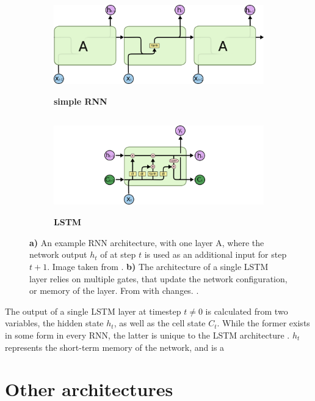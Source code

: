 \begin{figure}
	\centering
	\begin{subfigure}[h]{0.45\linewidth}
	\includegraphics[height=4.2cm]{imgs/simple_RNN.png}
	\caption{\textbf{simple RNN}\label{fig:simple-RNN}}
	\end{subfigure}
	\hfill
	\begin{subfigure}[h]{0.45\linewidth}
	\includegraphics[height=4.2cm]{imgs/LSTM.png}
	\caption{\textbf{LSTM}\label{fig:LSTM}}
	\end{subfigure}
	\caption*{\textbf{a)} An example RNN architecture, with one layer A, where the network output $h_t$ of at step $t$ is used as an additional input for step $t+1$. 
	Image taken from \cite{NN-images}. \textbf{b)} The architecture of a single LSTM layer relies on multiple gates, that update the network
	configuration, or memory of the layer. From \cite{NN-images} with changes. \label{fig:NN-architectures}.}
\end{figure}

The output of a single LSTM layer at timestep $t\neq0$ is calculated from two variables, the hidden state $h_t$, as well as the cell state $C_t$. While the former
exists in some form in every RNN, the latter is unique to the LSTM architecture \cite{gers2000learning}. $h_t$ represents the short-term memory of the network, and
is a

\section{Other architectures}
\label{sec:NN-other}
